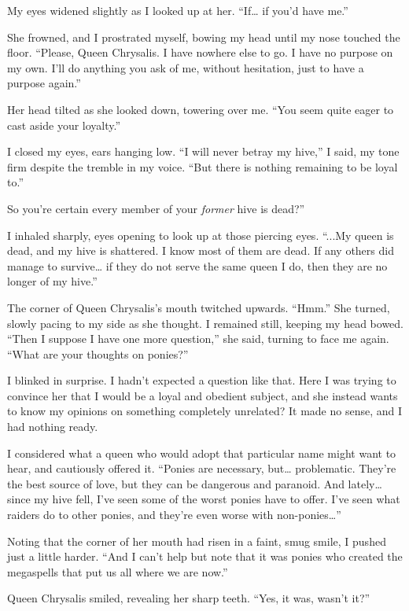 My eyes widened slightly as I looked up at her. “If… if you’d have me.”

She frowned, and I prostrated myself, bowing my head until my nose touched the floor. “Please, Queen Chrysalis. I have nowhere else to go. I have no purpose on my own. I’ll do anything you ask of me, without hesitation, just to have a purpose again.”

Her head tilted as she looked down, towering over me. “You seem quite eager to cast aside your loyalty.”

I closed my eyes, ears hanging low. “I will never betray my hive,” I said, my tone firm despite the tremble in my voice. “But there is nothing remaining to be loyal to.”

\leavevmode{}So you’re certain every member of your \textit{former} hive is dead?”

I inhaled sharply, eyes opening to look up at those piercing eyes. “...My queen is dead, and my hive is shattered. I know most of them are dead. If any others did manage to survive… if they do not serve the same queen I do, then they are no longer of my hive.”

The corner of Queen Chrysalis’s mouth twitched upwards. “Hmm.” She turned, slowly pacing to my side as she thought. I remained still, keeping my head bowed. “Then I suppose I have one more question,” she said, turning to face me again. “What are your thoughts on ponies?”

I blinked in surprise. I hadn’t expected a question like that. Here I was trying to convince her that I would be a loyal and obedient subject, and she instead wants to know my opinions on something completely unrelated? It made no sense, and I had nothing ready.

I considered what a queen who would adopt that particular name might want to hear, and cautiously offered it. “Ponies are necessary, but… problematic. They’re the best source of love, but they can be dangerous and paranoid. And lately… since my hive fell, I’ve seen some of the worst ponies have to offer. I’ve seen what raiders do to other ponies, and they’re even worse with non-ponies…”

Noting that the corner of her mouth had risen in a faint, smug smile, I pushed just a little harder. “And I can’t help but note that it was ponies who created the megaspells that put us all where we are now.”

Queen Chrysalis smiled, revealing her sharp teeth. “Yes, it was, wasn’t it?”

